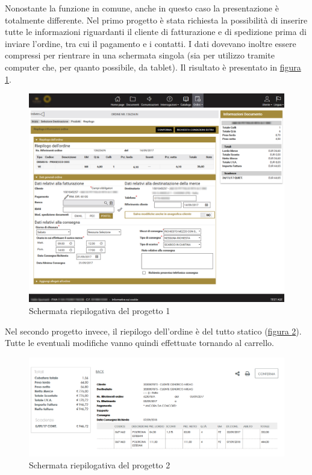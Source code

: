 Nonostante la funzione in comune, anche in questo caso la presentazione è totalmente differente. Nel primo progetto è stata richiesta la possibilità di inserire tutte le informazioni riguardanti il cliente di fatturazione e di spedizione prima di inviare l'ordine, tra cui il pagamento e i contatti. I dati dovevano inoltre essere compressi per rientrare in una schermata singola (sia per utilizzo tramite computer che, per quanto possibile, da tablet). Il risultato è presentato in \hyperref[fig:summary-1]{figura \ref{fig:summary-1}}.
\begin{figure}[H]
	\centering
	\includegraphics[width=\linewidth]{Immagini/p1/summary.png}
	\caption{Schermata riepilogativa del progetto 1}
	\label{fig:summary-1}
\end{figure}
Nel secondo progetto invece, il riepilogo dell'ordine è del tutto statico (\hyperref[fig:summary-2]{figura \ref{fig:summary-2}}). Tutte le eventuali modifiche vanno quindi effettuate tornando al carrello.
\begin{figure}[H]
	\centering
	\includegraphics[width=\linewidth]{Immagini/p2/summary.png}
	\caption{Schermata riepilogativa del progetto 2}
	\label{fig:summary-2}
\end{figure}

